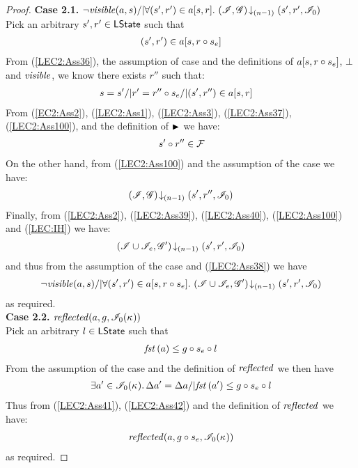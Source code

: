 \begin{lemma}
\begin{proof}
\noindent\textbf{Case 2.1.} 
%
$
	\neg\mathit{visible}(a, s) /| \forall (s', r') \in a[s, r].\, \left(\mathscr{I}, \mathscr{G}\right) \!\downarrow_{(n-1)} \left(s', r', \mathscr{I}_0\right)
$\\
%
Pick an arbitrary $s', r' \in \textsf{LState}$ such that 
\begin{align}
	(s', r') \in a[s, r \circ s_e]
	\label{LEC2:Ass38}
\end{align} 
%
From (\ref{LEC2:Ass36}), the assumption of case and the definitions of $a[s, r \circ s_e]$, $\mathrel{\bot}$ and $\mathit{visible}$, we know there exists $r''$ such that: 
%
\begin{align}
	& s = s' /| r' = r'' \circ s_e /| (s', r'') \in a[s, r] \label{LEC2:Ass100}
\end{align}
%
From (\ref{EC2:Ass2}), (\ref{LEC2:Ass1}), (\ref{LEC2:Ass3}), (\ref{LEC2:Ass37}), (\ref{LEC2:Ass100}), and the definition of $\strictfences$ we have:
%
\begin{align}
	s' \circ r'' \in \mathcal{F}_{}  \label{LEC2:Ass39}
\end{align}
%
On the other hand, from (\ref{LEC2:Ass100}) and the assumption of the case we have: 
%
\begin{align}
	\left(\mathscr{I}, \mathscr{G}\right) \!\downarrow_{(n-1)} \left(s', r'', \mathscr{I}_0\right) \label{LEC2:Ass40}
\end{align}
%
Finally, from (\ref{LEC2:Ass2}), (\ref{LEC2:Ass39}), (\ref{LEC2:Ass40}), (\ref{LEC2:Ass100}) and (\ref{LEC:IH}) we have:
%
\begin{align*}
	\left(\mathscr{I} \cup \mathscr{I}_{e}, \mathscr{G}'\right) \!\downarrow_{(n-1)} \left(s', r', \mathscr{I}_0\right)
\end{align*}
%
and thus from the assumption of the case and (\ref{LEC2:Ass38}) we have
%
\begin{align*}
	\neg\mathit{visible}(a, s) /| \forall (s', r') \in a[s, r \circ s_e].\, \left(\mathscr{I} \cup \mathscr{I}_{e}, \mathscr{G}'\right) \!\downarrow_{(n-1)} \left(s', r', \mathscr{I}_0\right)
\end{align*}
%
as required.\\

\noindent\textbf{Case 2.2.} $	\mathit{reflected}(a, g, \mathscr{I}_0(\kappa_{}))$\\
Pick an arbitrary $l \in \textsf{LState}$ such that 
%
\begin{align}
	\mathit{fst}\left(a\right) \leq g \circ s_e \circ l \label{LEC2:Ass41}
\end{align} 
%
From the assumption of the case and the definition of $\mathit{reflected}$ we then have
%
\begin{align}
	\exists a' \in \mathscr{I}_0(\kappa_{}).\, \Delta {a'} = \Delta {a} /| \mathit{fst}\left(a'\right) \leq g \circ s_e \circ l \label{LEC2:Ass42}
\end{align}
%
Thus from (\ref{LEC2:Ass41}), (\ref{LEC2:Ass42}) and the definition of $\mathit{reflected}$ we have:
%
\begin{align*}
	\mathit{reflected}(a, g \circ s_e, \mathscr{I}_0(\kappa_{}))
\end{align*}
%
as required.
%
\end{proof}
\end{lemma}
